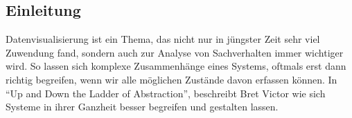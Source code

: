 \begin{newpage}
	
	\section{Einleitung}
		
	\label{sec:Einleitung}




		Datenvisualisierung ist ein Thema, das nicht nur in jüngster Zeit sehr viel Zuwendung fand, sondern auch zur Analyse von Sachverhalten immer wichtiger wird. So lassen sich komplexe Zusammenhänge eines Systems, oftmals erst dann richtig begreifen, wenn wir alle möglichen Zustände davon erfassen können. In "`Up and Down the Ladder of Abstraction"', beschreibt Bret Victor wie sich Systeme in ihrer Ganzheit besser begreifen und gestalten lassen.


\end{newpage}
